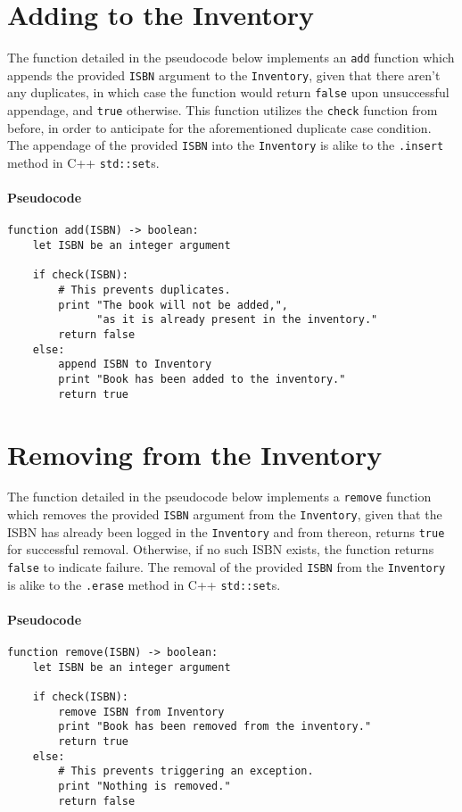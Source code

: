 \documentclass[12pt]{article}
\begin{document}
\pagebreak
\section{Adding to the Inventory}

The function detailed in the pseudocode below implements an \texttt{add} function which appends the provided \texttt{ISBN} argument to the \texttt{Inventory}, given that there aren't any duplicates, in which case the function would return \texttt{false} upon unsuccessful appendage, and \texttt{true} otherwise. This function utilizes the \texttt{check} function from before, in order to anticipate for the aforementioned duplicate case condition. The appendage of the provided \texttt{ISBN} into the \linebreak \texttt{Inventory} is alike to the \texttt{.insert} method in C++ \texttt{std::set}s.

\paragraph{Pseudocode}
\begin{verbatim}
function add(ISBN) -> boolean:
    let ISBN be an integer argument

    if check(ISBN):
        # This prevents duplicates.
        print "The book will not be added,",
              "as it is already present in the inventory."
        return false
    else:
        append ISBN to Inventory
        print "Book has been added to the inventory."
        return true
\end{verbatim}

\pagebreak
\section{Removing from the Inventory}

The function detailed in the pseudocode below implements a \texttt{remove} function which removes the provided \texttt{ISBN} argument from the \texttt{Inventory}, given that the ISBN has already been logged in the \texttt{Inventory} and from thereon, returns \texttt{true} for successful removal. Otherwise, if no such ISBN exists, the function returns \texttt{false} to indicate failure. The removal of the provided \texttt{ISBN} from the \texttt{Inventory} is alike to the \texttt{.erase} method in C++ \texttt{std::set}s.

\paragraph{Pseudocode}
\begin{verbatim}
function remove(ISBN) -> boolean:
    let ISBN be an integer argument

    if check(ISBN):
        remove ISBN from Inventory
        print "Book has been removed from the inventory."
        return true
    else:
        # This prevents triggering an exception.
        print "Nothing is removed."
        return false
\end{verbatim}
\end{document}
